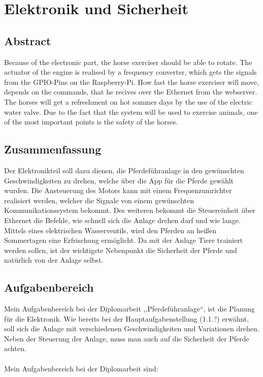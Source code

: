 \chapter{Elektronik und Sicherheit}
\label{sec:elektronikUndSicherheit}

\section{Abstract}
\label{sec:abstractETE}

Because of the electronic part, the horse exerciser should be able to rotate. 
The actuator of the engine is realised by a frequency converter, which gets the signals from the GPIO-Pins on the Raspberry-Pi.
How fast the horse exerciser will move, depends on the commands, that he recives over the Ethernet from the webserver.
The horses will get a refreshment on hot sommer days by the use of the electric water valve.
Due to the fact that the system will be used to exercise animals, one of the most important points is the safety of the horses.

\section{Zusammenfassung}
\label{sec:zusammenfassung}

Der Elektronikteil soll dazu dienen, die Pferdeführanlage in den gewünschten Geschwindigkeiten zu drehen, welche über die App für die Pferde gewählt wurden. 
Die Ansteuerung des Motors kann mit einem Frequenzumrichter realisiert werden, 
welcher die Signale von einem gewünschten Kommunikationssystem bekommt.
Des weiteren bekommt die Steuereinheit über Ethernet die Befehle, wie schnell sich die Anlage drehen darf und wie lange. 
Mittels eines elektrischen Wasserventils, wird den Pferden an heißen Sommertagen eine Erfrischung ermöglicht. 
Da mit der Anlage Tiere trainiert werden sollen, ist der wichtigste Nebenpunkt die Sicherheit der Pferde und natürlich von der Anlage selbst.
\newpage

\section{Aufgabenbereich}
\label{sec:aufgabenbereich}

Mein Aufgabenbereich bei der Diplomarbeit ,,Pferdeführanlage“, ist die Planung für die Elektronik. Wie bereits bei der Hauptaufgabenstellung (1.1.?) erwähnt, 
soll sich die Anlage mit verschiedenen Geschwindigkeiten und Variationen drehen.  Neben der Steuerung der Anlage, muss man auch auf die Sicherheit der Pferde achten.
\\
\\
Mein Aufgabenbereich bei der Diplomarbeit sind:

